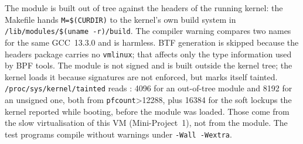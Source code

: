 The module is built out of tree against the headers of the running kernel:
the Makefile hands \texttt{M=\$(CURDIR)} to the kernel's own build system in
\texttt{/lib/modules/\$(uname -r)/build}. The compiler warning compares two
names for the same GCC~13.3.0 and is harmless. BTF generation is skipped
because the headers package carries no \texttt{vmlinux}; that affects only
the type information used by BPF tools. The module is not signed and is built
outside the kernel tree; the kernel loads it because signatures are not
enforced, but marks itself tainted. \texttt{/proc/sys/kernel/tainted} reads
\Tainted{}: 4096 for an out-of-tree module and 8192 for an unsigned one, both
from \texttt{pfcount}\ifnum\Tainted>12288{}, plus 16384 for the soft lockups
the kernel reported while booting, before the module was loaded. Those come
from the slow virtualisation of this VM (Mini-Project~1), not from the
module\fi. The test programs
compile without warnings under \texttt{-Wall -Wextra}.
